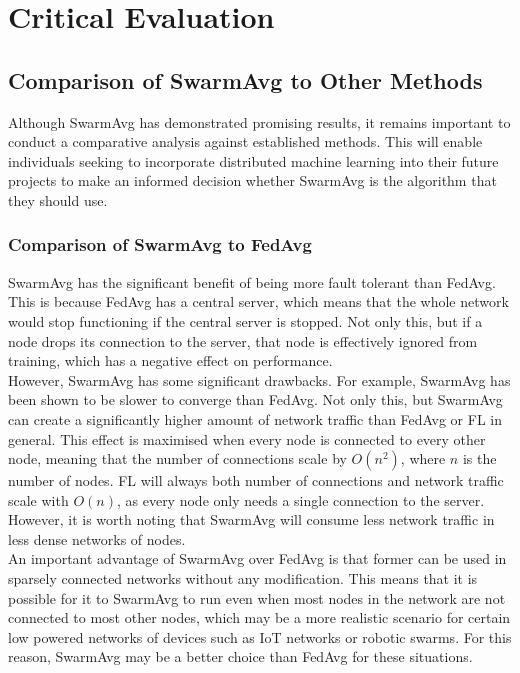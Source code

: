 \chapter{Critical Evaluation}
\section{Comparison of SwarmAvg to Other Methods}
Although SwarmAvg has demonstrated promising results, it remains important to conduct a comparative analysis against established methods. This will enable individuals seeking to incorporate distributed machine learning into their future projects to make an informed decision whether SwarmAvg is the algorithm that they should use.

\subsection{Comparison of SwarmAvg to FedAvg}
SwarmAvg has the significant benefit of being more fault tolerant than FedAvg. This is because FedAvg has a central server, which means that the whole network would stop functioning if the central server is stopped. Not only this, but if a node drops its connection to the server, that node is effectively ignored from training, which has a negative effect on performance. \\

However, SwarmAvg has some significant drawbacks. For example, SwarmAvg has been shown to be slower to converge than FedAvg. Not only this, but SwarmAvg can create a significantly higher amount of network traffic than FedAvg or FL in general. This effect is maximised when every node is connected to every other node, meaning that the number of connections scale by $O(n^2)$, where $n$ is the number of nodes. FL will always both number of connections and network traffic scale with $O(n)$, as every node only needs a single connection to the server. However, it is worth noting that SwarmAvg will consume less network traffic in less dense networks of nodes. \\

An important advantage of SwarmAvg over FedAvg is that former can be used in sparsely connected networks without any modification. This means that it is possible for it to SwarmAvg to run even when most nodes in the network are not connected to most other nodes, which may be a more realistic scenario for certain low powered networks of devices such as IoT networks or robotic swarms. For this reason, SwarmAvg may be a better choice than FedAvg for these situations.


